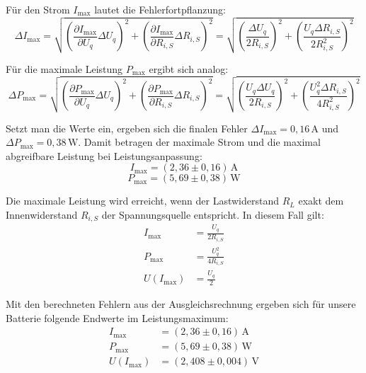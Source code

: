 \documentclass[12pt,a4paper,titlepage]{scrartcl}
\numberwithin{equation}{section}
\numberwithin{table}{section}
\numberwithin{figure}{section}
\begin{document}
Für den Strom $I_\text{max}$ lautet die Fehlerfortpflanzung:
\begin{equation}
    \Delta I_\text{max} = \sqrt{ \left( \frac{\partial I_\text{max}}{\partial U_q} \Delta U_q \right)^2 + \left( \frac{\partial I_\text{max}}{\partial R_{i{,}S}} \Delta R_{i{,}S} \right)^2 } = \sqrt{ \left( \frac{\Delta U_q}{2 R_{i{,}S}} \right)^2 + \left( \frac{U_q \Delta R_{i{,}S}}{2 R_{i{,}S}^2} \right)^2 }
\end{equation}

Für die maximale Leistung $P_\text{max}$ ergibt sich analog:
\begin{equation}
    \Delta P_\text{max} = \sqrt{ \left( \frac{\partial P_\text{max}}{\partial U_q} \Delta U_q \right)^2 + \left( \frac{\partial P_\text{max}}{\partial R_{i{,}S}} \Delta R_{i{,}S} \right)^2 } = \sqrt{ \left( \frac{U_q \Delta U_q}{2 R_{i{,}S}} \right)^2 + \left( \frac{U_q^2 \Delta R_{i{,}S}}{4 R_{i{,}S}^2} \right)^2 }
\end{equation}

Setzt man die Werte ein, ergeben sich die finalen Fehler $\Delta I_\text{max} = 0{,}16\,\text{A}$ und $\Delta P_\text{max} = 0{,}38\,\text{W}$. 
Damit betragen der maximale Strom und die maximal abgreifbare Leistung bei Leistungsanpassung:
\begin{equation}
    I_\text{max} = (2{,}36 \pm 0{,}16)\,\text{A}
\end{equation}
\begin{equation}
    P_\text{max} = (5{,}69 \pm 0{,}38)\,\text{W}
\end{equation}

\begin{resultbox}[Ergebnis]
    Die maximale Leistung wird erreicht, wenn der Lastwiderstand $R_L$ exakt dem Innenwiderstand $R_{i{,}S}$ der Spannungsquelle entspricht. 
    In diesem Fall gilt:
    \begin{align*}
        I_\text{max} &= \frac{U_q}{2 R_{i{,}S}} \\
        P_\text{max} &= \frac{U_q^2}{4 R_{i{,}S}} \\
        U(I_\text{max}) &= \frac{U_q}{2}
    \end{align*}
    
    Mit den berechneten Fehlern aus der Ausgleichsrechnung ergeben sich für unsere Batterie folgende Endwerte im Leistungsmaximum:
    \begin{align*}
        I_\text{max} &= (2{,}36 \pm 0{,}16)\,\text{A} \\
        P_\text{max} &= (5{,}69 \pm 0{,}38)\,\text{W} \\
        U(I_\text{max}) &= (2{,}408 \pm 0{,}004)\,\text{V}
    \end{align*}
\end{resultbox}
\end{document}

